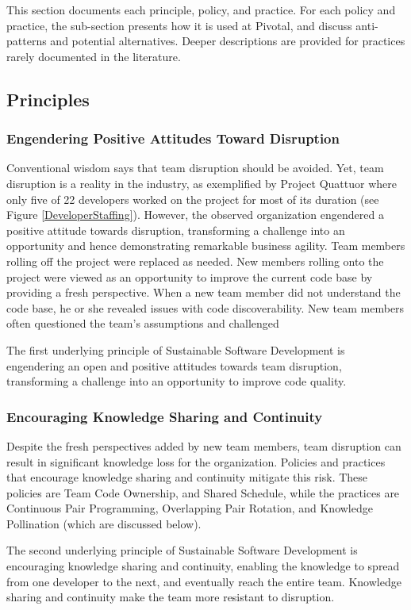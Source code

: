 This section documents each principle, policy, and practice. For each policy and practice, the sub-section presents how it is used at Pivotal, and discuss anti-patterns and potential alternatives. Deeper descriptions are provided for practices rarely documented in the literature.
\subsection{Principles}

\subsubsection{Engendering Positive Attitudes Toward Disruption}
Conventional wisdom says that team disruption should be avoided. Yet, team disruption is a reality in the industry, as exemplified by Project Quattuor where only five of 22 developers worked on the project for most of its duration (see Figure \ref{DeveloperStaffing}). However, the observed organization engendered a positive attitude towards disruption, transforming a challenge into an opportunity and hence demonstrating remarkable business agility. Team members rolling off the project were replaced as needed. New members rolling onto the project were viewed as an opportunity to improve the current code base by providing a fresh perspective. When a new team member did not understand the code base, he or she revealed issues with code discoverability. New team members often questioned the team's assumptions and challenged  

The first underlying principle of Sustainable Software Development is engendering an open and positive attitudes towards team disruption, transforming a challenge into an opportunity to improve code quality.

\subsubsection{Encouraging Knowledge Sharing and Continuity}
Despite the fresh perspectives added by new team members, team disruption can result in significant knowledge loss for the organization. Policies and practices that encourage knowledge sharing and continuity mitigate this risk. These policies are Team Code Ownership, and Shared Schedule, while the practices are Continuous Pair Programming, Overlapping Pair Rotation, and Knowledge Pollination (which are discussed below).

The second underlying principle of Sustainable Software Development is encouraging knowledge sharing and continuity, enabling the knowledge to spread from one developer to the next, and eventually reach the entire team. Knowledge sharing and continuity make the team more resistant to disruption. 

